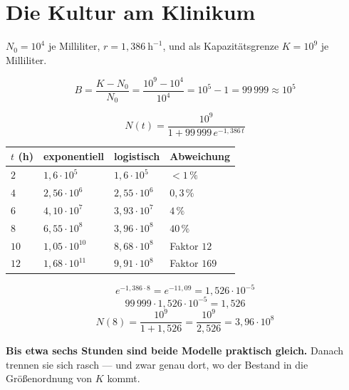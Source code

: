 \section{Die Kultur am Klinikum}

\begin{merksatz}
$N_0 = 10^4$ je Milliliter, $r = 1{,}386\ \mathrm{h}^{-1}$, und als Kapazitätsgrenze $K = 10^9$ je Milliliter.

\[ B = \frac{K-N_0}{N_0} = \frac{10^9 - 10^4}{10^4} = 10^5 - 1 = 99\,999 \approx 10^5 \]

\[ N(t) = \frac{10^9}{1 + 99\,999\,e^{-1{,}386\,t}} \]

\begin{center}
{\small
\renewcommand{\arraystretch}{1.48}
\begin{tabular}{@{}P{1.4cm}P{2.2cm}P{2.2cm}P{2.0cm}@{}}
\toprule
$t$ (h) & \textbf{exponentiell} & \textbf{logistisch} & \textbf{Abweichung}\\
\midrule
$2$ & $1{,}6\cdot10^{5}$ & $1{,}6\cdot10^{5}$ & \textcolor{gruen}{$<1\,\%$}\\
$4$ & $2{,}56\cdot10^{6}$ & $2{,}55\cdot10^{6}$ & \textcolor{gruen}{$0{,}3\,\%$}\\
$6$ & $4{,}10\cdot10^{7}$ & $3{,}93\cdot10^{7}$ & $4\,\%$\\
$8$ & $6{,}55\cdot10^{8}$ & $3{,}96\cdot10^{8}$ & \textcolor{akzent}{$40\,\%$}\\
$10$ & $1{,}05\cdot10^{10}$ & $8{,}68\cdot10^{8}$ & \textcolor{akzent}{Faktor $12$}\\
$12$ & $1{,}68\cdot10^{11}$ & $9{,}91\cdot10^{8}$ & \textcolor{akzent}{Faktor $169$}\\
\bottomrule
\end{tabular}}
\end{center}

\[ e^{-1{,}386\cdot8} = e^{-11{,}09} = 1{,}526\cdot10^{-5} \]
\[ 99\,999 \cdot 1{,}526\cdot10^{-5} = 1{,}526 \]
\[ N(8) = \frac{10^9}{1+1{,}526} = \frac{10^9}{2{,}526} = 3{,}96\cdot10^{8} \]

\begin{center}
\begin{minipage}{0.9\textwidth}
\textbf{Bis etwa sechs Stunden sind beide Modelle praktisch gleich.} Danach trennen sie sich rasch --- und zwar genau dort, wo der Bestand in die Größenordnung von $K$ kommt.
\end{minipage}
\end{center}


\end{merksatz}
